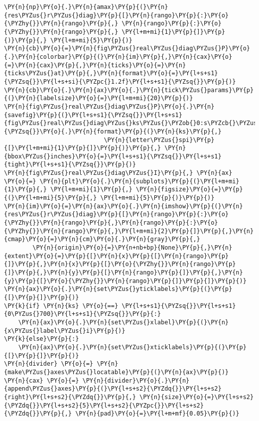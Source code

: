 \begin{Verbatim}[commandchars=\\\{\}]
    \PY{n}{np}\PY{o}{.}\PY{n}{amax}\PY{p}{(}\PY{n}{res\PYZus{}r\PYZus{}diag}\PY{p}{[}\PY{n}{rango}\PY{p}{:}\PY{o}{\PYZhy{}}\PY{n}{rango}\PY{p}{,} \PY{n}{rango}\PY{p}{:}\PY{o}{\PYZhy{}}\PY{n}{rango}\PY{p}{,} \PY{l+m+mi}{1}\PY{p}{]}\PY{p}{)}\PY{p}{,} \PY{l+m+mi}{5}\PY{p}{)}
\PY{n}{cb}\PY{o}{=}\PY{n}{fig\PYZus{}real\PYZus{}diag\PYZus{}P}\PY{o}{.}\PY{n}{colorbar}\PY{p}{(}\PY{n}{im}\PY{p}{,}\PY{n}{cax}\PY{o}{=}\PY{n}{cax}\PY{p}{,}\PY{n}{ticks}\PY{o}{=}\PY{n}{ticks\PYZus{}at}\PY{p}{,}\PY{n}{format}\PY{o}{=}\PY{l+s+s1}{\PYZsq{}}\PY{l+s+si}{\PYZpc{}1.2f}\PY{l+s+s1}{\PYZsq{}}\PY{p}{)}
\PY{n}{cb}\PY{o}{.}\PY{n}{ax}\PY{o}{.}\PY{n}{tick\PYZus{}params}\PY{p}{(}\PY{n}{labelsize}\PY{o}{=}\PY{l+m+mi}{20}\PY{p}{)}
\PY{n}{fig\PYZus{}real\PYZus{}diag\PYZus{}P}\PY{o}{.}\PY{n}{savefig}\PY{p}{(}\PY{l+s+s1}{\PYZsq{}}\PY{l+s+s1}{fig\PYZus{}real\PYZus{}diag\PYZus{}ks\PYZus{}\PYZob{}0:s\PYZcb{}\PYZus{}\PYZob{}1:s\PYZcb{}}\PY{l+s+s1}{\PYZsq{}}\PY{o}{.}\PY{n}{format}\PY{p}{(}\PY{n}{ks}\PY{p}{,}
                            \PY{n}{letter\PYZus{}spi}\PY{p}{[}\PY{l+m+mi}{1}\PY{p}{]}\PY{p}{)}\PY{p}{,} \PY{n}{bbox\PYZus{}inches}\PY{o}{=}\PY{l+s+s1}{\PYZsq{}}\PY{l+s+s1}{tight}\PY{l+s+s1}{\PYZsq{}}\PY{p}{)}
\PY{n}{fig\PYZus{}real\PYZus{}diag\PYZus{}I}\PY{p}{,} \PY{n}{ax} \PY{o}{=} \PY{n}{plt}\PY{o}{.}\PY{n}{subplots}\PY{p}{(}\PY{l+m+mi}{1}\PY{p}{,} \PY{l+m+mi}{1}\PY{p}{,} \PY{n}{figsize}\PY{o}{=}\PY{p}{(}\PY{l+m+mi}{5}\PY{p}{,} \PY{l+m+mi}{5}\PY{p}{)}\PY{p}{)}
\PY{n}{im}\PY{o}{=}\PY{n}{ax}\PY{o}{.}\PY{n}{imshow}\PY{p}{(}\PY{n}{res\PYZus{}r\PYZus{}diag}\PY{p}{[}\PY{n}{rango}\PY{p}{:}\PY{o}{\PYZhy{}}\PY{n}{rango}\PY{p}{,}\PY{n}{rango}\PY{p}{:}\PY{o}{\PYZhy{}}\PY{n}{rango}\PY{p}{,}\PY{l+m+mi}{2}\PY{p}{]}\PY{p}{,}\PY{n}{cmap}\PY{o}{=}\PY{n}{cm}\PY{o}{.}\PY{n}{gray}\PY{p}{,}
        \PY{n}{origin}\PY{o}{=}\PY{n+nb+bp}{None}\PY{p}{,}\PY{n}{extent}\PY{o}{=}\PY{p}{[}\PY{n}{x}\PY{p}{[}\PY{n}{rango}\PY{p}{]}\PY{p}{,}\PY{n}{x}\PY{p}{[}\PY{o}{\PYZhy{}}\PY{n}{rango}\PY{p}{]}\PY{p}{,}\PY{n}{y}\PY{p}{[}\PY{n}{rango}\PY{p}{]}\PY{p}{,}\PY{n}{y}\PY{p}{[}\PY{o}{\PYZhy{}}\PY{n}{rango}\PY{p}{]}\PY{p}{]}\PY{p}{)}
\PY{n}{ax}\PY{o}{.}\PY{n}{set\PYZus{}yticklabels}\PY{p}{(}\PY{p}{[}\PY{p}{]}\PY{p}{)}
\PY{k}{if} \PY{n}{ks} \PY{o}{==} \PY{l+s+s1}{\PYZsq{}}\PY{l+s+s1}{0\PYZus{}700}\PY{l+s+s1}{\PYZsq{}}\PY{p}{:}
    \PY{n}{ax}\PY{o}{.}\PY{n}{set\PYZus{}xlabel}\PY{p}{(}\PY{n}{x\PYZus{}label\PYZus{}i}\PY{p}{)}
\PY{k}{else}\PY{p}{:}
    \PY{n}{ax}\PY{o}{.}\PY{n}{set\PYZus{}xticklabels}\PY{p}{(}\PY{p}{[}\PY{p}{]}\PY{p}{)}
\PY{n}{divider} \PY{o}{=} \PY{n}{make\PYZus{}axes\PYZus{}locatable}\PY{p}{(}\PY{n}{ax}\PY{p}{)}
\PY{n}{cax} \PY{o}{=} \PY{n}{divider}\PY{o}{.}\PY{n}{append\PYZus{}axes}\PY{p}{(}\PY{l+s+s2}{\PYZdq{}}\PY{l+s+s2}{right}\PY{l+s+s2}{\PYZdq{}}\PY{p}{,} \PY{n}{size}\PY{o}{=}\PY{l+s+s2}{\PYZdq{}}\PY{l+s+s2}{5}\PY{l+s+s2}{\PYZpc{}}\PY{l+s+s2}{\PYZdq{}}\PY{p}{,} \PY{n}{pad}\PY{o}{=}\PY{l+m+mf}{0.05}\PY{p}{)}

\end{Verbatim}
